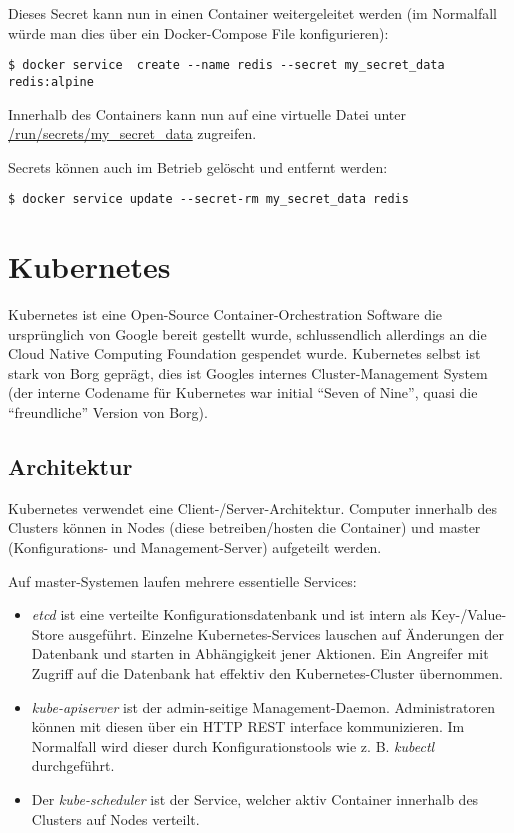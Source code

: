 Dieses Secret kann nun in einen Container weitergeleitet werden (im Normalfall würde man dies über ein Docker-Compose File konfigurieren):

\begin{verbatim}
$ docker service  create --name redis --secret my_secret_data redis:alpine
\end{verbatim}

Innerhalb des Containers kann nun auf eine virtuelle Datei unter \url{/run/secrets/my\_secret\_data} zugreifen.

Secrets können auch im Betrieb gelöscht und entfernt werden:

\begin{verbatim}
$ docker service update --secret-rm my_secret_data redis
\end{verbatim}

\section{Kubernetes}

Kubernetes ist eine Open-Source Container-Orchestration Software die ursprünglich von Google bereit gestellt wurde, schlussendlich allerdings an die Cloud Native Computing Foundation gespendet wurde. Kubernetes selbst ist stark von Borg geprägt, dies ist Googles internes Cluster-Management System (der interne Codename für Kubernetes war initial ``Seven of Nine'', quasi die ``freundliche'' Version von Borg).

\subsection{Architektur}

Kubernetes verwendet eine Client-/Server-Architektur. Computer innerhalb des Clusters können in Nodes (diese betreiben/hosten die Container) und master (Konfigurations- und Management-Server) aufgeteilt werden.

Auf master-Systemen laufen mehrere essentielle Services:

\begin{itemize}
	\item \textit{etcd} ist eine verteilte Konfigurationsdatenbank und ist intern als Key-/Value-Store ausgeführt. Einzelne Kubernetes-Services lauschen auf Änderungen der Datenbank und starten in Abhängigkeit jener Aktionen. Ein Angreifer mit Zugriff auf die Datenbank hat effektiv den Kubernetes-Cluster übernommen.
	\item \textit{kube-apiserver} ist der admin-seitige Management-Daemon. Administratoren können mit diesen über ein HTTP REST interface kommunizieren. Im Normalfall wird dieser durch Konfigurationstools wie z. B. \textit{kubectl} durchgeführt.
	\item Der \textit{kube-scheduler} ist der Service, welcher aktiv Container innerhalb des Clusters auf Nodes verteilt.
\end{itemize}

